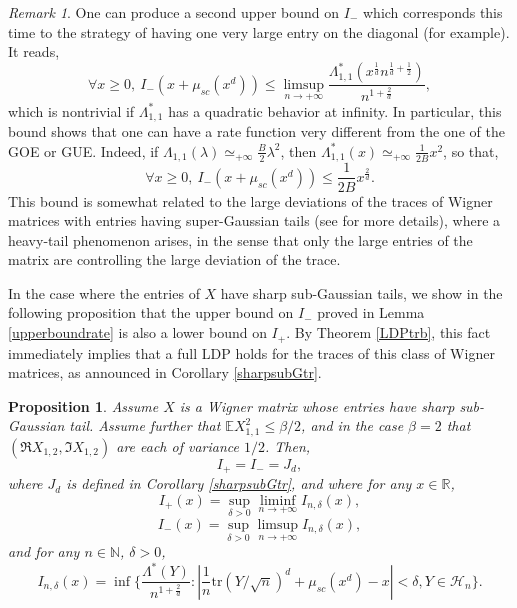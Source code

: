 \documentclass[aop,preprint]{imsart}
\newcommand\NN{\mathbb{N}}
\newcommand\RR{\mathbb{R}}
\newcommand\EE{\mathbb{E}}
\newcommand\tr{\mathrm{tr}}
\numberwithin{equation}{section}
\theoremstyle{definition}
\theoremstyle{plain}
\newtheorem{Pro}[Def]{Proposition}
\theoremstyle{remark}
\newtheorem{Rem}[Def]{Remark}
\begin{document}
\begin{Rem}
One can produce a second upper bound on $I_-$ which corresponds this time to the strategy of having one very large entry on the diagonal (for example). It reads,
$$ \forall x \geq 0, \ I_-(x+\mu_{sc}(x^d)) \leq \limsup_{n\to +\infty} \frac{\Lambda^*_{1,1}(x^{\frac{1}{d}} n^{\frac{1}{d}+\frac{1}{2}})}{n^{1+\frac{2}{d}}},$$
which is nontrivial if $\Lambda^*_{1,1}$ has a quadratic behavior at infinity. In particular, this bound shows that one can have a rate function very different from the one of the GOE or GUE. Indeed, if $\Lambda_{1,1}(\lambda) \simeq_{+\infty} \frac{B}{2}\lambda^2$, then $\Lambda^*_{1,1}(x)\simeq_{+\infty} \frac{1}{2B}x^2$, so that,
$$ \forall x \geq 0, \ I_-(x+\mu_{sc}(x^d)) \leq \frac{1}{2B}x^{\frac{2}{d}}.$$
This bound is somewhat related to the large deviations of the traces of Wigner matrices with entries having super-Gaussian tails (see \cite{LDPtr} for more details), where a heavy-tail phenomenon arises, in the sense that only the large entries of the matrix are controlling the large deviation of the trace.








\end{Rem}


In the case where the entries of $X$ have sharp sub-Gaussian tails, we show in the following proposition that the upper bound on $I_-$ proved in Lemma \ref{upperboundrate} is also a lower bound on $I_+$. By Theorem \ref{LDPtrb}, this fact immediately implies that a full LDP holds for the traces of this class of Wigner matrices, as announced in Corollary \ref{sharpsubGtr}.

\begin{Pro}
Assume $X$ is a Wigner matrix whose entries have sharp sub-Gaussian tail. Assume further that $\EE X_{1,1}^2 \leq \beta/2$, and  in the case  $\beta=2$ that $(\Re X_{1,2}, \Im X_{1,2})$ are each of variance $1/2$.
Then,
$$ I_+ = I_- = J_d,$$
where $J_d$ is defined in Corollary \ref{sharpsubGtr}, and where for any $x\in\RR$,
$$ I_+(x) =  \sup_{\delta>0}\liminf_{n\to +\infty} I_{n,\delta}(x),$$
$$ I_-(x) =\sup_{\delta>0}\limsup_{n\to +\infty} I_{n,\delta}(x),$$
and for any $n\in \NN$, $\delta>0$,
$$ I_{n,\delta}(x) = \inf \Big\{ \frac{\Lambda^*(Y)}{n^{1+\frac{2}{d}}} : |\frac{1}{n} \tr (Y/\sqrt{n})^d + \mu_{sc}(x^d) - x| <\delta, Y \in \mathcal{H}_n \Big\}.$$ 
\end{Pro}
\end{document}
